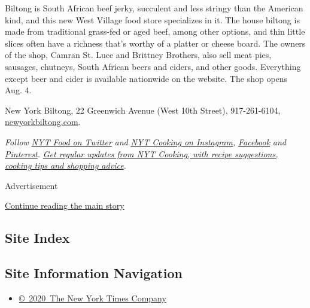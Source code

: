 Biltong is South African beef jerky, succulent and less stringy than the
American kind, and this new West Village food store specializes in it.
The house biltong is made from traditional grass-fed or aged beef, among
other options, and thin little slices often have a richness that's
worthy of a platter or cheese board. The owners of the shop, Camran St.
Luce and Brittney Brothers, also sell meat pies, sausages, chutneys,
South African beers and ciders, and other goods. Everything except beer
and cider is available nationwide on the website. The shop opens Aug. 4.

New York Biltong, 22 Greenwich Avenue (West 10th Street), 917-261-6104,
\href{https://newyorkbiltong.com/}{newyorkbiltong.com}.

\emph{Follow} \href{https://twitter.com/nytfood}{\emph{NYT Food on
Twitter}} \emph{and}
\href{https://www.instagram.com/nytcooking/}{\emph{NYT Cooking on
Instagram}}\emph{,}
\href{https://www.facebook.com/nytcooking/}{\emph{Facebook}} \emph{and}
\href{https://www.pinterest.com/nytcooking/}{\emph{Pinterest}}\emph{.}
\href{https://www.nytimes.com/newsletters/cooking}{\emph{Get regular
updates from NYT Cooking, with recipe suggestions, cooking tips and
shopping advice}}\emph{.}

Advertisement

\protect\hyperlink{after-bottom}{Continue reading the main story}

\hypertarget{site-index}{%
\subsection{Site Index}\label{site-index}}

\hypertarget{site-information-navigation}{%
\subsection{Site Information
Navigation}\label{site-information-navigation}}

\begin{itemize}
\tightlist
\item
  \href{https://help.nytimes.com/hc/en-us/articles/115014792127-Copyright-notice}{©~2020~The
  New York Times Company}
\end{itemize}

